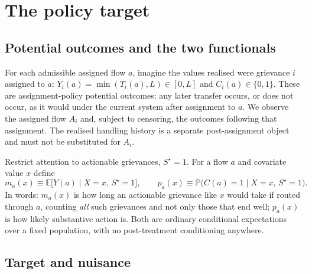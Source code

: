 \documentclass[11pt,a4paper]{article}
\theoremstyle{plain}
\theoremstyle{definition}
\theoremstyle{remark}
\newcommand{\E}{\mathbb E}
\newcommand{\Prob}{\mathbb P}
\newcommand{\Sstar}{S^{\star}}
\begin{document}
\section{The policy target}\label{sec:estimand}

\subsection{Potential outcomes and the two functionals}

For each admissible assigned flow $a$, imagine the values realised were grievance $i$ assigned
to $a$: $Y_i(a)=\min(T_i(a),L)\in[0,L]$ and $C_i(a)\in\{0,1\}$. These are assignment-policy
potential outcomes: any later transfer occurs, or does not occur, as it would under the current
system after assignment to $a$. We observe the assigned flow $A_i$ and, subject to censoring,
the outcomes following that assignment. The realised handling history is a separate
post-assignment object and must not be substituted for $A_i$.

Restrict attention to actionable grievances, $\Sstar=1$. For a flow $a$ and covariate value $x$
define
\begin{equation}
m_a(x)\equiv\E\bigl[Y(a)\mid X=x,\,\Sstar=1\bigr],
\qquad
p_a(x)\equiv\Prob\bigl(C(a)=1\mid X=x,\,\Sstar=1\bigr).
\label{eq:nuisance}
\end{equation}
In words: $m_a(x)$ is how long an actionable grievance like $x$ would take if routed through
$a$, counting \emph{all} such grievances and not only those that end well; $p_a(x)$ is how
likely substantive action is. Both are ordinary conditional expectations over a fixed
population, with no post-treatment conditioning anywhere.

\subsection{Target and nuisance}\label{sec:nuisance-def}
\end{document}
